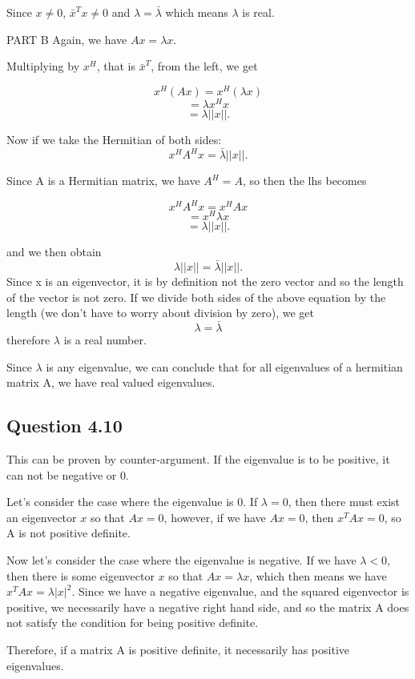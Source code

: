 \documentclass[12pt,a4paper]{report}
\begin{document}
Since $x \neq 0$, $\bar{x}^Tx \neq 0$ and $\lambda = \bar{\lambda}$ which means $\lambda$ is real.


PART B
Again, we have $Ax = \lambda x$.

Multiplying by $x^H$, that is $\bar{x}^T$, from the left, we get

$$x^H(Ax) = x^H(\lambda x)$$
$$ = \lambda x^H x$$
$$ = \lambda \lvert \lvert x \rvert \rvert.$$


Now if we take the Hermitian of both sides:
$$x^H A^H x = \bar{\lambda} \lvert \lvert x \rvert \rvert.$$

Since A is a Hermitian matrix, we have $A^H = A$, so then the lhs becomes

$$x^H A^H x = x^H A x$$
$$= x^H \lambda x$$
$$ = \lambda \lvert \lvert x \rvert \rvert.$$

and we then obtain
$$\lambda \lvert \lvert x \rvert \rvert = \bar{\lambda} \lvert \lvert x \rvert \rvert.$$
Since x is an eigenvector, it is by definition not the zero vector and so the length
of the vector is not zero. If we divide both sides of the above equation by the length
(we don't have to worry about division by zero), we get $$\lambda = \bar{\lambda}$$
therefore $\lambda$ is a real number.

Since $\lambda$ is any eigenvalue, we can conclude that for all eigenvalues of a hermitian
matrix A, we have real valued eigenvalues.

\subsection*{Question 4.10}
This can be proven by counter-argument.
If the eigenvalue is to be positive, it can not be negative or 0.

Let's consider the case where the eigenvalue is 0. If $\lambda=0$,
then there must exist an eigenvector $x$ so that $Ax = 0$, however, if we have
$Ax=0$, then $x^TAx = 0$, so A is not positive definite.

Now let's consider the case where the eigenvalue is negative. If we have
$\lambda < 0$, then there is some eigenvector $x$ so that $Ax = \lambda x$,
which then means we have $x^TAx=\lambda \lvert x \rvert^2$. Since we have a
negative eigenvalue, and the squared eigenvector is positive, we necessarily
have a negative right hand side, and so the matrix A does not satisfy the
condition for being positive definite.

Therefore, if a matrix A is positive definite, it necessarily has positive eigenvalues.
\end{document}
